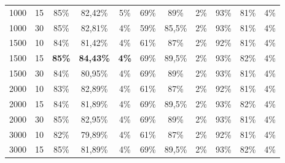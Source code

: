 \begin{table}[ht]
\begin{tabular}{cc|ccc|ccc|ccc}
        {1000}   & {15}     & {85\%}                              & {82,42\%}                           & {5\%}                                    & {69\%}        & {89\%}      & {2\%}       & {93\%}        & {81\%}      & {4\%}       \\
        {1000}   & {30}     & {85\%}                              & {82,81\%}                           & {4\%}                                    & {59\%}        & {85,5\%}    & {2\%}       & {93\%}        & {81\%}      & {4\%}       \\
        {1500}   & {10}     & {84\%}                              & {81,42\%}                           & {4\%}                                    & {61\%}        & {87\%}      & {2\%}       & {92\%}        & {81\%}      & {4\%}       \\
        {1500}   & {15}     & \textbf{85\%}                       & \textbf{84,43\%}                    & \textbf{4\%}                             & {69\%}        & {89,5\%}    & {2\%}       & {93\%}        & {82\%}      & {4\%}       \\
        {1500}   & {30}     & {84\%}                              & {80,95\%}                           & {4\%}                                    & {69\%}        & {89\%}      & {2\%}       & {93\%}        & {81\%}      & {4\%}       \\
        {2000}   & {10}     & {83\%}                              & {82,89\%}                           & {4\%}                                    & {61\%}        & {87\%}      & {2\%}       & {92\%}        & {81\%}      & {4\%}       \\
        {2000}   & {15}     & {84\%}                              & {81,89\%}                           & {4\%}                                    & {69\%}        & {89,5\%}    & {2\%}       & {93\%}        & {82\%}      & {4\%}       \\
        {2000}   & {30}     & {85\%}                              & {82,95\%}                           & {4\%}                                    & {69\%}        & {89\%}      & {2\%}       & {93\%}        & {81\%}      & {4\%}       \\
        {3000}   & {10}     & {82\%}                              & {79,89\%}                           & {4\%}                                    & {61\%}        & {87\%}      & {2\%}       & {92\%}        & {81\%}      & {4\%}       \\
        {3000}   & {15}     & {85\%}                              & {81,89\%}                           & {4\%}                                    & {69\%}        & {89,5\%}    & {2\%}       & {93\%}        & {82\%}      & {4\%}       \\

\end{tabular}
\end{table}
